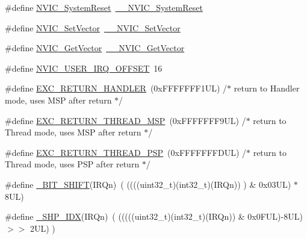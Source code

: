 \begin{DoxyCompactItemize}
\item 
\#define \hyperlink{group___c_m_s_i_s___core___n_v_i_c_functions_ga6aa0367d3642575610476bf0366f0c48}{N\+V\+I\+C\+\_\+\+System\+Reset}~\hyperlink{group___c_m_s_i_s___core___n_v_i_c_functions_ga0d9aa2d30fa54b41eb780c16e35b676c}{\+\_\+\+\_\+\+N\+V\+I\+C\+\_\+\+System\+Reset}
\item 
\#define \hyperlink{group___c_m_s_i_s___core___n_v_i_c_functions_ga804af63bb4c4c317387897431814775d}{N\+V\+I\+C\+\_\+\+Set\+Vector}~\hyperlink{group___c_m_s_i_s___core___n_v_i_c_functions_ga0df355460bc1783d58f9d72ee4884208}{\+\_\+\+\_\+\+N\+V\+I\+C\+\_\+\+Set\+Vector}
\item 
\#define \hyperlink{group___c_m_s_i_s___core___n_v_i_c_functions_ga955eb1c33a3dcc62af11a8385e8c0fc8}{N\+V\+I\+C\+\_\+\+Get\+Vector}~\hyperlink{group___c_m_s_i_s___core___n_v_i_c_functions_ga44b665d2afb708121d9b10c76ff00ee5}{\+\_\+\+\_\+\+N\+V\+I\+C\+\_\+\+Get\+Vector}
\item 
\#define \hyperlink{group___c_m_s_i_s___core___n_v_i_c_functions_ga8045d905a5ca57437d8e6f71ffcb6df5}{N\+V\+I\+C\+\_\+\+U\+S\+E\+R\+\_\+\+I\+R\+Q\+\_\+\+O\+F\+F\+S\+ET}~16
\item 
\#define \hyperlink{group___c_m_s_i_s___core___n_v_i_c_functions_gaa6fa2b10f756385433e08522d9e4632f}{E\+X\+C\+\_\+\+R\+E\+T\+U\+R\+N\+\_\+\+H\+A\+N\+D\+L\+ER}~(0x\+F\+F\+F\+F\+F\+F\+F1\+U\+L)     /$\ast$ return to Handler mode, uses M\+S\+P after return                               $\ast$/
\item 
\#define \hyperlink{group___c_m_s_i_s___core___n_v_i_c_functions_gaea4703101b5e679f695e231f7ee72331}{E\+X\+C\+\_\+\+R\+E\+T\+U\+R\+N\+\_\+\+T\+H\+R\+E\+A\+D\+\_\+\+M\+SP}~(0x\+F\+F\+F\+F\+F\+F\+F9\+U\+L)     /$\ast$ return to Thread mode, uses M\+S\+P after return                                $\ast$/
\item 
\#define \hyperlink{group___c_m_s_i_s___core___n_v_i_c_functions_ga9998daf0fbdf31dbc8f81cd604b58175}{E\+X\+C\+\_\+\+R\+E\+T\+U\+R\+N\+\_\+\+T\+H\+R\+E\+A\+D\+\_\+\+P\+SP}~(0x\+F\+F\+F\+F\+F\+F\+F\+D\+U\+L)     /$\ast$ return to Thread mode, uses P\+S\+P after return                                $\ast$/
\item 
\#define \hyperlink{group___c_m_s_i_s___core___n_v_i_c_functions_ga53c75b28823441c6153269f0ecbed878}{\+\_\+\+B\+I\+T\+\_\+\+S\+H\+I\+FT}(I\+R\+Qn)~(  ((((uint32\+\_\+t)(int32\+\_\+t)(I\+R\+Qn))         )      \&  0x03\+U\+L) $\ast$ 8\+U\+L)
\item 
\#define \hyperlink{group___c_m_s_i_s___core___n_v_i_c_functions_gaee4f7eb5d7e770ad51489dbceabb1755}{\+\_\+\+S\+H\+P\+\_\+\+I\+DX}(I\+R\+Qn)~( (((((uint32\+\_\+t)(int32\+\_\+t)(I\+R\+Qn)) \& 0x0\+F\+U\+L)-\/8\+U\+L) $>$$>$    2\+U\+L)      )
$$
\end{DoxyCompactItemize}
